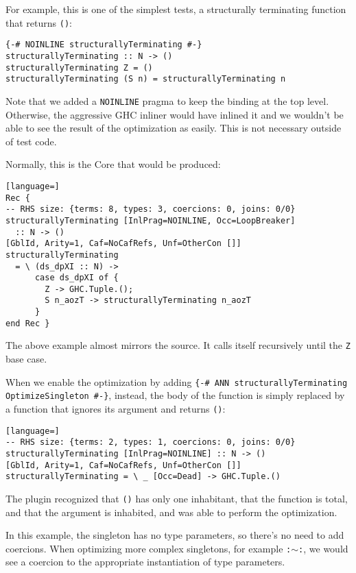 For example, this is one of the simplest tests, a structurally terminating function that returns \texttt{()}:

\begin{lstlisting}
{-# NOINLINE structurallyTerminating #-}
structurallyTerminating :: N -> ()
structurallyTerminating Z = ()
structurallyTerminating (S n) = structurallyTerminating n
\end{lstlisting}

Note that we added a \texttt{NOINLINE} pragma to keep the binding at the top level.
Otherwise, the aggressive GHC inliner would have inlined it and we wouldn't be able to see the result of the optimization as easily.
This is not necessary outside of test code.

Normally, this is the Core that would be produced:

\begin{lstlisting}[language=]
Rec {
-- RHS size: {terms: 8, types: 3, coercions: 0, joins: 0/0}
structurallyTerminating [InlPrag=NOINLINE, Occ=LoopBreaker]
  :: N -> ()
[GblId, Arity=1, Caf=NoCafRefs, Unf=OtherCon []]
structurallyTerminating
  = \ (ds_dpXI :: N) ->
      case ds_dpXI of {
        Z -> GHC.Tuple.();
        S n_aozT -> structurallyTerminating n_aozT
      }
end Rec }
\end{lstlisting}

The above example almost mirrors the source.
It calls itself recursively until the \texttt{Z} base case.

When we enable the optimization by adding \texttt{\{-\# ANN structurallyTerminating OptimizeSingleton \#-\}}, instead, the body of the function is simply replaced by a function that ignores its argument and returns \texttt{()}:

\begin{lstlisting}[language=]
-- RHS size: {terms: 2, types: 1, coercions: 0, joins: 0/0}
structurallyTerminating [InlPrag=NOINLINE] :: N -> ()
[GblId, Arity=1, Caf=NoCafRefs, Unf=OtherCon []]
structurallyTerminating = \ _ [Occ=Dead] -> GHC.Tuple.()
\end{lstlisting}

The plugin recognized that \texttt{()} has only one inhabitant, that the function is total, and that the argument is inhabited, and was able to perform the optimization.

In this example, the singleton has no type parameters, so there's no need to add coercions.
When optimizing more complex singletons, for example \texttt{:$\sim$:}, we would see a coercion to the appropriate instantiation of type parameters.

